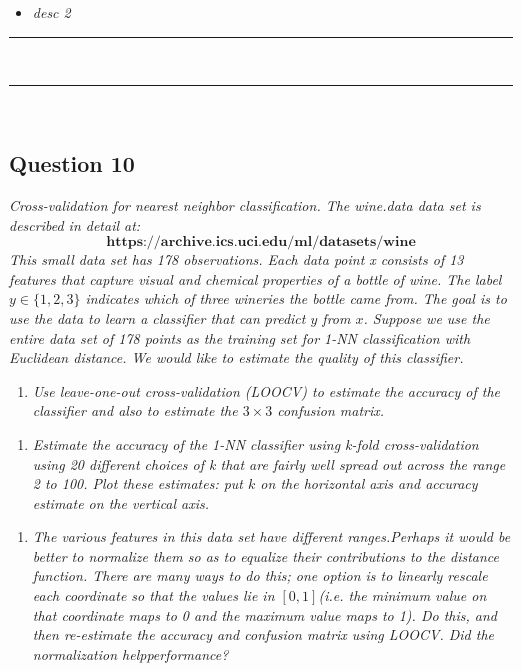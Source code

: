 \documentclass{article}
\begin{document}
\begin{itemize}
    \item \textit{desc 2}
\end{itemize}

\noindent\rule{\textwidth}{0.4pt}\\
\noindent\rule{\textwidth}{0.4pt}\\

\newpage
\subsection*{Question 10}
\textit{Cross-validation for nearest neighbor classification.
The wine.data data set is described in detail at:\newline \newline$$\textbf{https://archive.ics.uci.edu/ml/datasets/wine}$$
\newline This small data set has 178 observations. Each data point x consists of 13 features that capture visual
and chemical properties of a bottle of wine. The label $y \in \{1,2,3\}$ indicates which of three wineries
the bottle came from. The goal is to use the data to learn a classifier that can predict $y$ from $x$.\newline
\newline Suppose we use the entire data set of 178 points as the training set for 1-NN classification with Euclidean distance. We would like to estimate the quality of this classifier.}\\

\begin{enumerate}[label=(a)]
  \item \textit{Use leave-one-out cross-validation (LOOCV) to estimate the accuracy of the classifier and also
to estimate the $3 \times3$ confusion matrix.}
\end{enumerate}

\begin{enumerate}[label=(b)]
  \item \textit{Estimate the accuracy of the 1-NN classifier using k-fold cross-validation using 20 different choices
of k that are fairly well spread out across the range 2 to 100. Plot these estimates: put $k$ on the
horizontal axis and accuracy estimate on the vertical axis.}
\end{enumerate}

\begin{enumerate}[label=(c)]
  \item \textit{The various features in this data set have different ranges.Perhaps it would be better to normalize them so as to equalize their contributions to the distance function. There are many ways to do this; one option is to linearly rescale each coordinate so that the values lie in $[0,1]$(i.e. the minimum value on that coordinate maps to 0 and the maximum value maps to 1). Do this, and then re-estimate the accuracy and confusion matrix using LOOCV. Did the normalization helpperformance?}
\end{enumerate}
\end{document}
